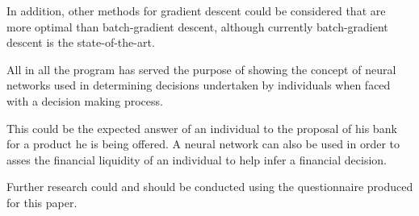 \documentclass[12pt]{article}
\begin{document}
In addition, other methods for gradient descent could be considered that are more optimal than batch-gradient descent, although currently batch-gradient descent is the state-of-the-art.

All in all the program has served the purpose of showing the concept of neural networks used in determining decisions undertaken by individuals when faced with a decision making process. 

This could be the expected answer of an individual to the proposal of his bank for a product he is being offered. A neural network can also be used in order to asses the financial liquidity of an individual to help infer a financial decision. 

Further research could and should be conducted using the questionnaire produced for this paper.

\printbibliography{}
\end{document}
